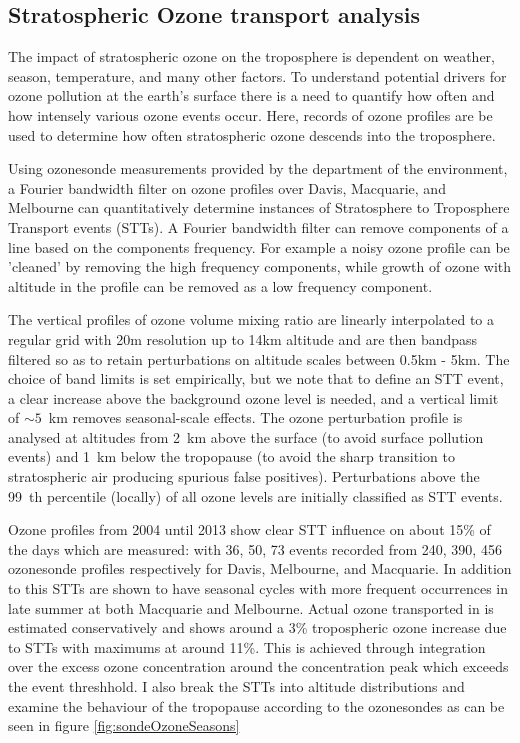 \subsection{Stratospheric Ozone transport analysis}
The impact of stratospheric ozone on the troposphere is dependent on weather, season, temperature, and many other factors.
To understand potential drivers for ozone pollution at the earth's surface there is a need to quantify how often and how intensely various ozone events occur.
Here, records of ozone profiles are be used to determine how often stratospheric ozone descends into the troposphere.

Using ozonesonde measurements provided by the department of the environment, a Fourier bandwidth filter on ozone profiles over Davis, Macquarie, and Melbourne can quantitatively determine instances of Stratosphere to Troposphere Transport events (STTs).
A Fourier bandwidth filter can remove components of a line based on the components frequency.
For example a noisy ozone profile can be 'cleaned' by removing the high frequency components, while growth of ozone with altitude in the profile can be removed as a low frequency component. 

The vertical profiles of ozone volume mixing ratio are linearly interpolated to a regular grid with 20m resolution up to 14km altitude and are then bandpass filtered so as to retain perturbations on altitude scales between 0.5km - 5km. The choice of band limits is set empirically, but we note that to define an STT event, a clear increase above the background ozone level is needed, and a vertical limit of $\sim 5$~km removes seasonal-scale effects. 
The ozone perturbation profile is analysed at altitudes from 2~km above the surface (to avoid surface pollution events) and 1~km below the tropopause (to avoid the sharp transition to stratospheric air producing spurious false positives). Perturbations above the 99~th percentile (locally) of all ozone levels are initially classified as STT events.

Ozone profiles from 2004 until 2013 show clear STT influence on about 15\% of the days which are measured: with 36, 50, 73 events recorded from 240, 390, 456 ozonesonde profiles respectively for Davis, Melbourne, and Macquarie.
In addition to this STTs are shown to have seasonal cycles with more frequent occurrences in late summer at both Macquarie and Melbourne.
Actual ozone transported in is estimated conservatively and shows around a 3\% tropospheric ozone increase due to STTs with maximums at around 11\%.
This is achieved through integration over the excess ozone concentration around the concentration peak which exceeds the event threshhold. 
I also break the STTs into altitude distributions and examine the behaviour of the tropopause according to the ozonesondes as can be seen in figure \ref{fig:sondeOzoneSeasons}

